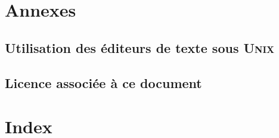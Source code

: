 \documentclass[titlepage,twoside,a4paper]{book}
\newcounter{remarque-cnt}
\newcounter{example-cnt}
\newcommand{\Unix}{\textsc{Unix}}
\newcommand{\myparttitle}{}
\newcommand{\mypart}[1]{
	{
		\pagestyle{empty}
		\part{#1}
	}
	\renewcommand{\myparttitle}{#1 -- }
}
\begin{document}

\mypart{Annexes}
\begin{appendix}




\setcounter{remarque-cnt}{1}
\setcounter{example-cnt}{1}
\chapter{Utilisation des {\'e}diteurs de texte sous {\Unix}}




\chapter{Licence associ{\'e}e {\`a} ce document}



\clearpage
\newpage
\renewcommand{\myparttitle}{\bibname -- }

\end{appendix}

\clearpage
\lhead[Conventions]{}
\chead{}

\clearpage						%

\clearpage
\newpage
\part{Index}
\printindex
\renewcommand{\myparttitle}{}
\end{document}
